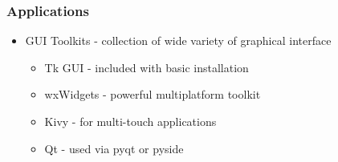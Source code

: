 \documentclass[14pt]{beamer}
\begin{document}
    \begin{frame}
        \frametitle{Applications}
        \begin{itemize}
            \item GUI Toolkits - collection of wide variety of graphical interface
                \begin{itemize}
                    \item Tk GUI - included with basic installation
                    \item wxWidgets - powerful multiplatform toolkit
                    \item Kivy - for multi-touch applications
                    \item Qt - used via pyqt or pyside
                \end{itemize}
        \end{itemize}
    \end{frame}
\end{document}

